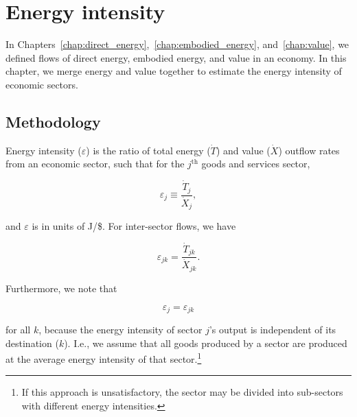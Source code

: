 %
%
%
\chapter{Energy intensity}
\label{chap:intensity} %

In Chapters~\ref{chap:direct_energy},~\ref{chap:embodied_energy}, and~\ref{chap:value}, 
we defined flows of direct energy, embodied energy, and value in an economy.
In this chapter, we merge energy and value together to estimate
the energy intensity of economic sectors.


\section{Methodology}

Energy intensity ($\varepsilon$) is the ratio 
of total energy ($\dot{T}$) and value ($\dot{X}$) outflow rates 
from an economic sector, 
such that for the $j^{\mathrm{th}}$ goods and services sector,

\begin{equation} \label{eq:epsilon_output_def_g_and_s}
	\varepsilon_{j} \equiv \frac{\dot{T}_{j}}{\dot{X}_{j}},
\end{equation}

\noindent{}and $\varepsilon$ is in units of J/\$. 
For inter-sector flows, we have

\begin{equation} \label{eq:epsilon_transfers_1}
	\varepsilon_{jk} = \frac{\dot{T}_{jk}}{\dot{X}_{jk}}.
\end{equation}

Furthermore, we note that 

\begin{equation} \label{eq:epsilon_equiv_1}
	\varepsilon_{j} = \varepsilon_{jk}
\end{equation}

\noindent{}for all $k$, because the energy intensity 
of sector $j$'s output is independent of its destination ($k$). 
I.e., we assume that all goods produced by a sector 
are produced at the average energy intensity 
of that sector.\footnote{If this approach is unsatisfactory, 
the sector may be divided into sub-sectors 
with different energy intensities.}

